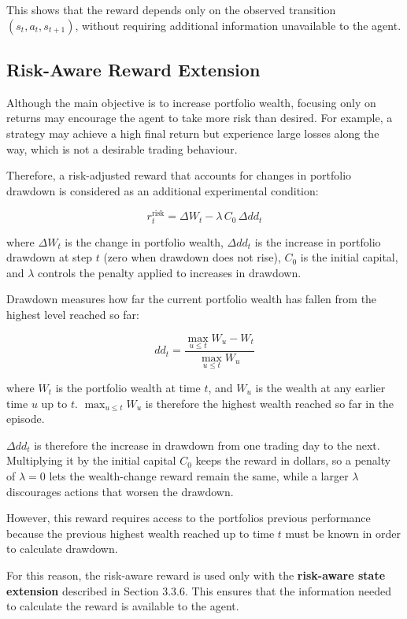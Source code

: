 This shows that the reward depends only on the observed transition
\(\left( s_{t},a_{t},s_{t + 1} \right)\), without requiring additional
information unavailable to the agent.

\subsection{Risk-Aware Reward Extension}

Although the main objective is to increase portfolio wealth, focusing
only on returns may encourage the agent to take more risk than desired.
For example, a strategy may achieve a high final return but experience
large losses along the way, which is not a desirable trading behaviour.

Therefore, a risk-adjusted reward that accounts for changes in portfolio
drawdown is considered as an additional experimental condition:

\[r_{t}^{\mathrm{risk}} = \Delta W_{t} - \lambda\, C_{0}\, \Delta dd_{t}\]

where \(\Delta W_{t}\) is the change in portfolio wealth,
\(\Delta dd_{t}\) is the increase in portfolio drawdown at step \(t\)
(zero when drawdown does not rise), \(C_{0}\) is the initial capital,
and \(\lambda\) controls the penalty applied to increases in drawdown.

Drawdown measures how far the current portfolio wealth has fallen from
the highest level reached so far:

\[dd_{t} = \frac{\max_{u \leq t}W_{u} - W_{t}}{\max_{u \leq t}W_{u}}\]

where \(W_{t}\) is the portfolio wealth at time \(t\), and \(W_{u}\) is the
wealth at any earlier time \(u\) up to \(t\).
\(\max_{u \leq t}W_{u}\) is therefore the highest wealth reached so far
in the episode.

\(\Delta dd_{t}\) is therefore the increase in drawdown from one trading
day to the next. Multiplying it by the initial capital \(C_{0}\) keeps
the reward in dollars, so a penalty of \(\lambda = 0\) lets the
wealth-change reward remain the same, while a larger \(\lambda\)
discourages actions that worsen the drawdown.

However, this reward requires access to the
portfolio\textquotesingle s previous performance because the previous
highest wealth reached up to time \(t\) must be known in order to
calculate drawdown.

For this reason, the risk-aware reward is used only with the
\textbf{risk-aware state extension} described in Section 3.3.6. This
ensures that the information needed to calculate the reward is available
to the agent.

